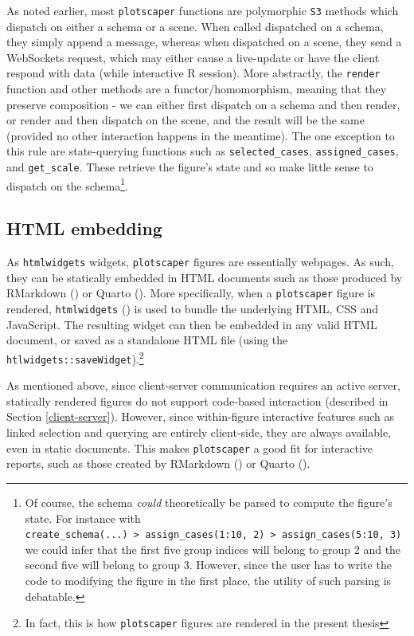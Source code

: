 \documentclass[
  openany]{book}
\theoremstyle{definition}
\theoremstyle{definition}
\theoremstyle{definition}
\theoremstyle{definition}
\theoremstyle{remark}
\begin{document}
As noted earlier, most \texttt{plotscaper} functions are polymorphic \texttt{S3} methods which dispatch on either a schema or a scene. When called dispatched on a schema, they simply append a message, whereas when dispatched on a scene, they send a WebSockets request, which may either cause a live-update or have the client respond with data (while interactive R session). More abstractly, the \texttt{render} function and other methods are a functor/homomorphism, meaning that they preserve composition - we can either first dispatch on a schema and then render, or render and then dispatch on the scene, and the result will be the same (provided no other interaction happens in the meantime). The one exception to this rule are state-querying functions such as \texttt{selected\_cases}, \texttt{assigned\_cases}, and \texttt{get\_scale}. These retrieve the figure's state and so make little sense to dispatch on the schema\footnote{Of course, the schema \emph{could} theoretically be parsed to compute the figure's state. For instance with \texttt{create\_schema(...)\ \textbar{}\textgreater{}\ assign\_cases(1:10,\ 2)\ \textbar{}\textgreater{}\ assign\_cases(5:10,\ 3)} we could infer that the first five group indices will belong to group 2 and the second five will belong to group 3. However, since the user has to write the code to modifying the figure in the first place, the utility of such parsing is debatable.}.

\subsection{HTML embedding}\label{html-embedding}

As \texttt{htmlwidgets} widgets, \texttt{plotscaper} figures are essentially webpages. As such, they can be statically embedded in HTML documents such as those produced by RMarkdown () or Quarto (). More specifically, when a \texttt{plotscaper} figure is rendered, \texttt{htmlwidgets} () is used to bundle the underlying HTML, CSS and JavaScript. The resulting widget can then be embedded in any valid HTML document, or saved as a standalone HTML file (using the \texttt{htlwidgets::saveWidget}).\footnote{In fact, this is how \texttt{plotscaper} figures are rendered in the present thesis}

As mentioned above, since client-server communication requires an active server, statically rendered figures do not support code-based interaction (described in Section \ref{client-server}). However, since within-figure interactive features such as linked selection and querying are entirely client-side, they are always available, even in static documents. This makes \texttt{plotscaper} a good fit for interactive reports, such as those created by RMarkdown () or Quarto ().
\end{document}

